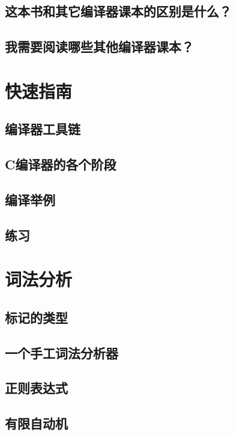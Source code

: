 \documentclass[cn,11pt,chinese]{elegantbook}
\begin{document}
\section{这本书和其它编译器课本的区别是什么？}

\section{我需要阅读哪些其他编译器课本？}

\chapter{快速指南}

\section{编译器工具链}

\section{C编译器的各个阶段}

\section{编译举例}

\section{练习}

\chapter{词法分析}

\section{标记的类型}

\section{一个手工词法分析器}

\section{正则表达式}

\section{有限自动机}
\end{document}
